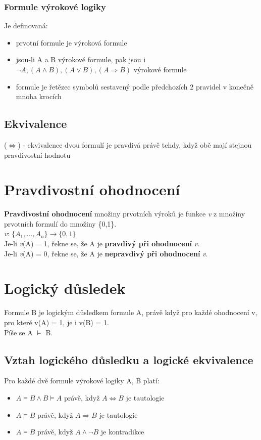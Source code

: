 \documentclass{szzclass}
\begin{document}
\subsubsection{Formule výrokové logiky}
Je definovaná:
\begin{itemize}
	\item prvotní formule je výroková formule
	\item jsou-li A a B výrokové formule, pak jsou i $ \neg A, (A \wedge B), (A \vee B), (A \Rightarrow B)$ výrokové formule
	\item formule je řetězec symbolů sestavený podle předchozích 2 pravidel v konečně mnoha krocích
\end{itemize}
\subsection{Ekvivalence}
($\Leftrightarrow$) - ekvivalence dvou formulí je pravdivá právě tehdy, když obě mají stejnou pravdivostní hodnotu
\section{Pravdivostní ohodnocení}
\textbf{Pravdivostní ohodnocení} množiny prvotních výroků je funkce \textit{v} z množiny prvotních formulí do množiny \{0,1\}.
\\
\textit{v}: $\{A_1,...,A_n\}\rightarrow \{0,1\}$
\\
Je-li \textit{v}(A) = 1, řekne se, že A je \textbf{pravdivý při ohodnocení} \textit{v}.\\
Je-li \textit{v}(A) = 0, řekne se, že A je \textbf{nepravdivý při ohodnocení} \textit{v}.
\section{Logický důsledek}
Formule B je logickým důsledkem formule A, právě když pro každé ohodnocení v, pro které v(A) = 1,
je i v(B) = 1.
\\
Píše se A $\models$ B.
\subsection{Vztah logického důsledku a logické ekvivalence}
Pro každé dvě formule výrokové logiky A, B platí:
\begin{itemize}
	\item $A \models B \wedge B \models A$ právě, když $A \Leftrightarrow B$ je tautologie
	\item $A \models B$ právě, když $A \Rightarrow B$ je tautologie
	\item $A \models B$ právě, když $A \wedge \neg B$ je kontradikce
\end{itemize}
\end{document}
